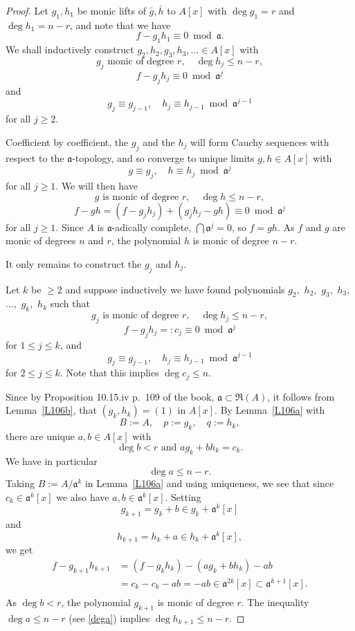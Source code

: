 \documentclass[parskip=half,fontsize=12pt]{scrartcl}%
\newcommand{\mf}{\mathfrak}
\newcommand{\aaa}{\mf a}
\begin{document}
\begin{proof}
Let $g_1,h_1$ be monic lifts of $\bar g,\bar h$ to $A[x]$ with $\deg g_1=r$ and $\deg h_1=n-r$, and note that we have 
$$
f-g_1h_1\equiv0\bmod\aaa.
$$ 
We shall inductively construct $g_2,h_2,g_3,h_3,\ldots\in A[x]$ with 
$$
g_j\text{ monic of degree }r,\quad\deg h_j\le n-r,%
$$ 
$$
f-g_jh_j\equiv0\bmod\aaa^j
$$ 
and 
$$
g_j\equiv g_{j-1},\quad h_j\equiv h_{j-1}\bmod\aaa^{j-1}
$$ 
for all $j\ge2$. 

Coefficient by coefficient, the $g_j$ and the $h_j$ will form Cauchy sequences with respect to the $\aaa$-topology, and so converge to unique limits $g,h\in A[x]$ with 
$$
g\equiv g_j,\quad h\equiv h_j\bmod\aaa^j
$$ 
for all $j\ge1$. We will then have 
$$
g\text{ is monic of degree }r,\quad\deg h\le n-r,
$$ 
$$
f-gh=(f-g_jh_j)+(g_jh_j-gh)\equiv0\bmod\aaa^j
$$ 
for all $j\ge1$. Since $A$ is $\aaa$-adically complete, $\bigcap\aaa^j=0$, so $f=gh$. As $f$ and $g$ are monic of degrees $n$ and $r$, the polynomial $h$ is monic of degree $n-r$. 

It only remains to construct the $g_j$ and $h_j$. 

Let $k$ be $\ge2$ and suppose inductively we have found polynomials $g_2,$ $h_2,$ $g_3,$ $h_3,$ $\dots,$ $g_k,$ $h_k$ such that 
$$
g_j\text{ is monic of degree }r,\quad\deg h_j\le n-r,%
$$ 
$$
f-g_jh_j=:c_j\equiv0\bmod\aaa^j
$$ 
for $1\le j\le k$, and 
$$
g_j\equiv g_{j-1},\quad h_j\equiv h_{j-1}\bmod\aaa^{j-1}
$$ 
for $2\le j\le k$. Note that this implies $\deg c_j\le n$. 

Since by Proposition 10.15.iv p.~109 of the book, $\aaa\subset\mf R(A)$, it follows from Lemma~\ref{L106b}, that $(g_k,h_k)=(1)$ in $A[x]$. By Lemma~\ref{L106a} with 
$$
B:=A,\quad p:=g_k,\quad q:=h_k,
$$ 
there are unique $a,b\in A[x]$ with 
$$
\deg b<r\text{ and }ag_k+bh_k=c_k.
$$ 
We have in particular 
\begin{equation}\label{dega}
\deg a\le n-r.
\end{equation}
Taking $B:=A/\aaa^k$ in Lemma~\ref{L106a} and using uniqueness, we see that since $c_k\in\aaa^k[x]$ we also have $a,b\in\aaa^k[x]$. Setting  
$$
g_{k+1}=g_k+b\in g_k+\aaa^k[x]
$$ 
and 
$$
h_{k+1}=h_k+a\in h_k+\aaa^k[x],
$$ 
we get 
\[
\begin{split}
f-g_{k+1}h_{k+1}&=(f-g_kh_k)-(ag_k+bh_k)-ab\\
&=c_k-c_k-ab=-ab\in\aaa^{2k}[x]\subset\aaa^{k+1}[x].\\
\end{split} 
\] 
As $\deg b<r$, the polynomial $g_{k+1}$ is monic of degree $r$. The inequality $\deg a\le n-r$ (see \eqref{dega}) implies $\deg h_{k+1}\le n-r$.%
\end{proof}
\end{document}
